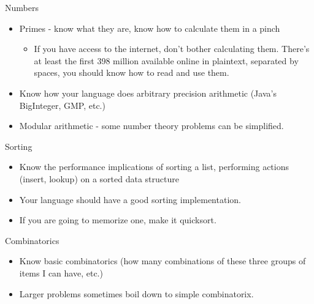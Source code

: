 \documentclass{beamer}
\begin{document}
\begin{frame}{Numbers}
  \begin{centering}
    \begin{itemize}
      \item Primes - know what they are, know how to calculate them in a pinch
      \begin{itemize}
        \item If you have access to the internet, don't bother calculating them. There's at least the first 398 million available online in plaintext, separated by spaces, you should know how to read and use them.
      \end{itemize}
      \item Know how your language does arbitrary precision arithmetic (Java's BigInteger, GMP, etc.)
      \item Modular arithmetic - some number theory problems can be simplified.
    \end{itemize}
  \end{centering}
\end{frame}

\begin{frame}{Sorting}
  \begin{centering}
    \begin{itemize}
      \item Know the performance implications of sorting a list, performing actions (insert, lookup) on a sorted data structure
      \item Your language should have a good sorting implementation.
      \item If you are going to memorize one, make it quicksort.
    \end{itemize}
  \end{centering}
\end{frame}

\begin{frame}{Combinatorics}
  \begin{centering}
    \begin{itemize}
      \item Know basic combinatorics (how many combinations of these three groups of items I can have, etc.)
      \item Larger problems sometimes boil down to simple combinatorix.
      \pause
    \end{itemize}
  \end{centering}
\end{frame}
\end{document}
